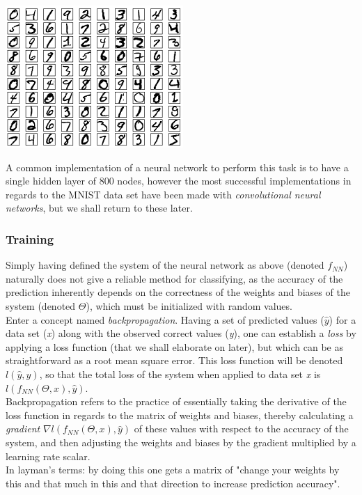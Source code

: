 \begin{Figure}
 \centering
 \includegraphics[width=0.7\linewidth]{images/mnist}
 \captionsetup{width=0.8\linewidth, font=small}
\end{Figure}

\noindent A common implementation of a neural network to perform this task is to have a single hidden layer of 800 nodes, however the most successful implementations in regards to the MNIST data set have been made with \textit{convolutional neural networks}, but we shall return to these later.

\subsubsection{Training}
Simply having defined the system of the neural network as above (denoted $f_{NN}$) naturally does not give a reliable method for classifying, as the accuracy of the prediction inherently depends on the correctness of the weights and biases of the system (denoted $\Theta$), which must be initialized with random values. \\
Enter a concept named \textit{backpropagation}. Having a set of predicted values ($\hat{y}$) for a data set (\textit{x}) along with the observed correct values (\textit{y}), one can establish a \textit{loss} by applying a loss function (that we shall elaborate on later), but which can be as straightforward as a root mean square error. This loss function will be denoted $l(\hat{y},y)$, so that the  total loss of the system when applied to data set \textit{x} is $l(f_{NN}(\Theta, x), \hat{y})$.\\
Backpropagation refers to the practice of essentially taking the derivative of the loss function in regards to the matrix of weights and biases, thereby calculating a \textit{gradient} $\nabla{l(f_{NN}(\Theta, x), \hat{y})}$ of these values with respect to the accuracy of the system, and then adjusting the weights and biases by the gradient multiplied by a learning rate scalar.\\
In layman's terms: by doing this one gets a matrix of "change your weights by this and that much in this and that direction to increase prediction accuracy".



